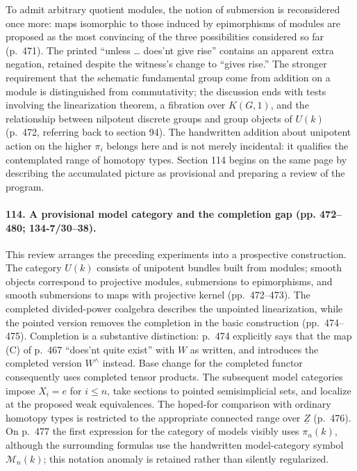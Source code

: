 To admit arbitrary quotient modules, the notion of submersion is reconsidered once more: maps isomorphic to those induced by epimorphisms of modules are proposed as the most convincing of the three possibilities considered so far (p.~471). The printed ``unless \ldots{} does'nt give rise'' contains an apparent extra negation, retained despite the witness's change to ``gives rise.'' The stronger requirement that the schematic fundamental group come from addition on a module is distinguished from commutativity; the discussion ends with tests involving the linearization theorem, a fibration over $K(G,1)$, and the relationship between nilpotent discrete groups and group objects of $U(k)$ (p.~472, referring back to section 94). The handwritten addition about unipotent action on the higher $\pi_i$ belongs here and is not merely incidental: it qualifies the contemplated range of homotopy types. Section 114 begins on the same page by describing the accumulated picture as provisional and preparing a review of the program.

\paragraph{114. A provisional model category and the completion gap (pp. 472--480; 134-7/30--38).}
This review arranges the preceding experiments into a prospective construction. The category $U(k)$ consists of unipotent bundles built from modules; smooth objects correspond to projective modules, submersions to epimorphisms, and smooth submersions to maps with projective kernel (pp.~472--473). The completed divided-power coalgebra describes the unpointed linearization, while the pointed version removes the completion in the basic construction (pp.~474--475). Completion is a substantive distinction: p.~474 explicitly says that the map (C) of p.~467 ``does'nt quite exist'' with $W$ as written, and introduces the completed version $W^{\wedge}$ instead. Base change for the completed functor consequently uses completed tensor products. The subsequent model categories impose $X_i=e$ for $i\leq n$, take sections to pointed semisimplicial sets, and localize at the proposed weak equivalences. The hoped-for comparison with ordinary homotopy types is restricted to the appropriate connected range over $\underline Z$ (p.~476). On p.~477 the first expression for the category of models visibly uses $\pi_n(k)$, although the surrounding formulas use the handwritten model-category symbol $\mathcal M_n(k)$; this notation anomaly is retained rather than silently regularized.

